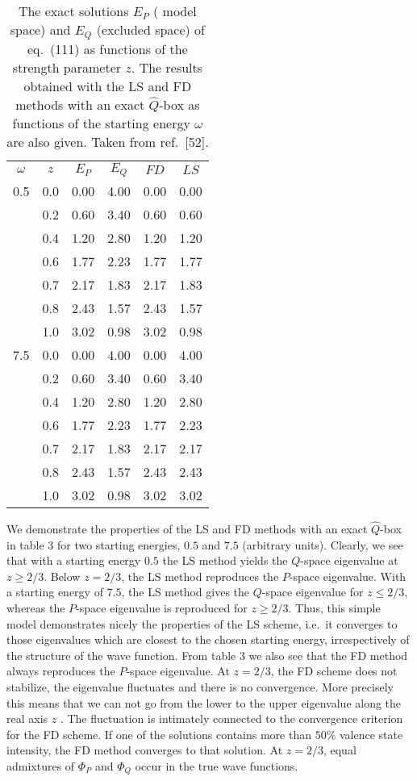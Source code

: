 \begin{table}[hbtp]
\begin{center}
\caption{The exact solutions $E_P$ ( model space) and 
$E_Q$ (excluded space) of eq.\ (111) 
as functions of the strength parameter $z$.
The results obtained with the LS and FD methods with an
exact $\hat{Q}$-box as functions
of the starting energy $\omega$ are also given.
Taken from ref.\ [52].}
\begin{tabular}{rrrrrr}
&&&&&\\\hline
\multicolumn{1}{c}{$\omega$}&
\multicolumn{1}{c}{$z$}&
\multicolumn{1}{c}{$E_P$}&
\multicolumn{1}{c}{$E_Q$}&
\multicolumn{1}{c}{$FD$}&
\multicolumn{1}{c}{$LS$}\\
\hline
0.5&0.0&0.00&4.00&0.00&0.00\\
   &0.2&0.60&3.40&0.60&0.60\\
   &0.4&1.20&2.80&1.20&1.20\\
   &0.6&1.77&2.23&1.77&1.77\\
   &0.7&2.17&1.83&2.17&1.83\\
   &0.8&2.43&1.57&2.43&1.57\\
   &1.0&3.02&0.98&3.02&0.98\\
7.5&0.0&0.00&4.00&0.00&4.00\\
   &0.2&0.60&3.40&0.60&3.40\\
   &0.4&1.20&2.80&1.20&2.80\\
   &0.6&1.77&2.23&1.77&2.23\\
   &0.7&2.17&1.83&2.17&2.17\\
   &0.8&2.43&1.57&2.43&2.43\\
   &1.0&3.02&0.98&3.02&3.02\\
   \hline 
\end{tabular}
\end{center}
\end{table}
We demonstrate the properties of the LS and FD methods with an
exact $\hat{Q}$-box in table 3 for two starting energies,
$0.5$ and $7.5$ (arbitrary units). Clearly, we see that with a starting 
energy $0.5$ the LS method yields the $Q$-space eigenvalue at $z\geq 2/3$.
Below $z=2/3$, the LS method reproduces the $P$-space eigenvalue. 
With a starting energy of $7.5$, the LS method 
gives the $Q$-space eigenvalue
for $z\leq 2/3$, whereas the $P$-space eigenvalue is reproduced for
$z\geq 2/3$. Thus, this simple model demonstrates nicely the properties of
the LS scheme, i.e.\ it converges to those eigenvalues which are
closest to the chosen starting energy, irrespectively of the structure of
the wave function. From table 3 we also see that the FD
method always reproduces the $P$-space eigenvalue. 
At $z=2/3$, the FD
scheme does not stabilize, the eigenvalue fluctuates and there is
no convergence. More precisely this means that we can not
go from the lower to the upper
eigenvalue along the real axis $z$ \cite{eo77}.
The fluctuation is intimately connected to the convergence
criterion for the FD scheme. If one of the solutions contains
more than $50\%$ valence state intensity, the FD method converges
to that solution. At $z=2/3$, equal admixtures of $\Phi_P$
and $\Phi_Q$ occur in the true wave functions.


